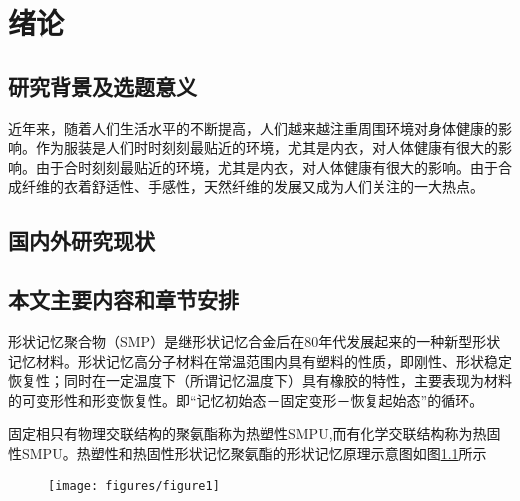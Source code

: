 \chapter{绪论}
\label{chap:intro}
\section{研究背景及选题意义}

近年来，随着人们生活水平的不断提高，人们越来越注重周围环境对身体健康的影响。作为服装是人们时时刻刻最贴近的环境，尤其是内衣，对人体健康有很大的影响。由于合时刻刻最贴近的环境，尤其是内衣，对人体健康有很大的影响。由于合成纤维的衣着舒适性、手感性，天然纤维的发展又成为人们关注的一大热点。\supercite{Takahashi1996Structure,Xia2002Analysis,Jiang1989,Mao2000Motion,Feng1998}

\section{国内外研究现状}

\section{本文主要内容和章节安排}


形状记忆聚合物（SMP）是继形状记忆合金后在80年代发展起来的一种新型形状记忆材料\cite{Jiang2005Size}。形状记忆高分子材料在常温范围内具有塑料的性质，即刚性、形状稳定恢复性；同时在一定温度下（所谓记忆温度下）具有橡胶的特性，主要表现为材料的可变形性和形变恢复性。即“记忆初始态－固定变形－恢复起始态”的循环。

固定相只有物理交联结构的聚氨酯称为热塑性SMPU,而有化学交联结构称为热固性SMPU。热塑性和热固性形状记忆聚氨酯的形状记忆原理示意图如图\ref{fig:diagram}所示

\begin{figure}
	\centering
		\texttt{[image: figures/figure1]}
 \label{fig:diagram}
 
\end{figure}


